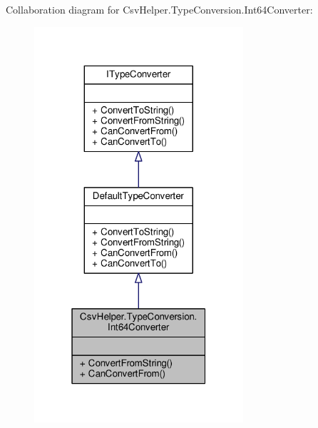 Collaboration diagram for Csv\-Helper.\-Type\-Conversion.\-Int64\-Converter\-:
\nopagebreak
\begin{figure}[H]
\begin{center}
\leavevmode
\includegraphics[width=220pt]{a00523}
\end{center}
\end{figure}
